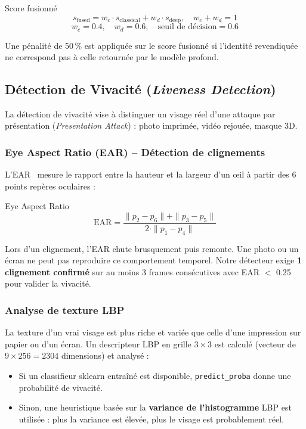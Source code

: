 \documentclass[12pt,a4paper]{article}
\begin{document}
\begin{formulebox}{Score fusionné}
\[
  s_{\text{fused}} = w_c \cdot s_{\text{classical}} + w_d \cdot s_{\text{deep}},
  \quad w_c + w_d = 1
\]
\[
  w_c = 0.4, \quad w_d = 0.6, \quad \text{seuil de décision} = 0.6
\]
\end{formulebox}

Une pénalité de 50\,\% est appliquée sur le score fusionné si l'identité
revendiquée ne correspond pas à celle retournée par le modèle profond.

\subsection{Détection de Vivacité (\textit{Liveness Detection})}

La détection de vivacité vise à distinguer un visage réel d'une attaque par
présentation (\textit{Presentation Attack}) : photo imprimée, vidéo rejouée,
masque 3D.

\subsubsection{Eye Aspect Ratio (EAR) – Détection de clignements}

L'EAR~\cite{soukupova2016} mesure le rapport entre la hauteur et la largeur
d'un œil à partir des 6 points repères oculaires :

\begin{formulebox}{Eye Aspect Ratio}
\[
  \text{EAR} = \frac{\|p_2 - p_6\| + \|p_3 - p_5\|}{2 \cdot \|p_1 - p_4\|}
\]
\end{formulebox}

Lors d'un clignement, l'EAR chute brusquement puis remonte. Une photo ou un
écran ne peut pas reproduire ce comportement temporel. Notre détecteur exige
\textbf{1 clignement confirmé} sur au moins 3 frames consécutives avec EAR $<$
0.25 pour valider la vivacité.

\subsubsection{Analyse de texture LBP}

La texture d'un vrai visage est plus riche et variée que celle d'une impression
sur papier ou d'un écran. Un descripteur LBP en grille $3\times 3$ est calculé
(vecteur de $9 \times 256 = 2304$ dimensions) et analysé :
\begin{itemize}
  \item Si un classifieur sklearn entraîné est disponible, \texttt{predict\_proba}
        donne une probabilité de vivacité.
  \item Sinon, une heuristique basée sur la \textbf{variance de l'histogramme}
        LBP est utilisée : plus la variance est élevée, plus le visage est
        probablement réel.
\end{itemize}
\end{document}
